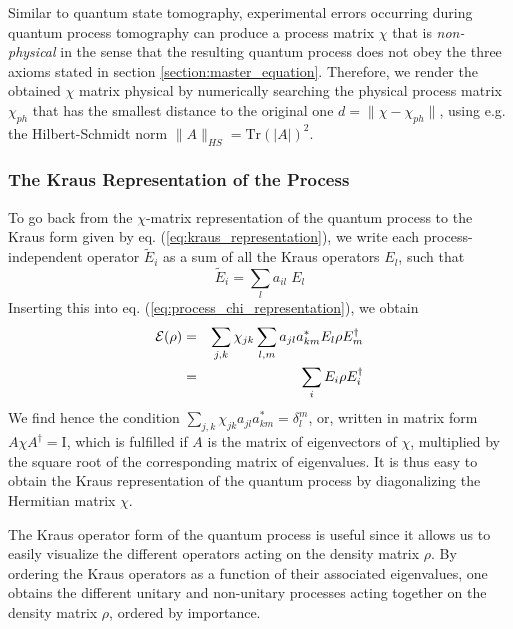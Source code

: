 \smallskip

Similar to quantum state tomography, experimental errors occurring during quantum process tomography can produce a process matrix $\chi$ that is {\it non-physical} in the sense that the resulting quantum process does not obey the three axioms stated in section \ref{section:master_equation}. Therefore, we render the obtained $\chi$ matrix physical by numerically searching the  physical process matrix $\chi_{ph}$ that has the smallest distance to the original one $d=\|\chi-\chi_{ph}\|$, using e.g. the Hilbert-Schmidt norm $\|A\|_{HS} = \mathrm{Tr}(|A|)^2$. 

\subsubsection{The Kraus Representation of the Process}

To go back from the $\chi$-matrix representation of the quantum process to the Kraus form given by eq. (\ref{eq:kraus_representation}), we write each process-independent operator $\tilde{E}_i$ as a sum of all the Kraus operators $E_l$, such that
%
\begin{equation}
	\tilde{E}_i = \sum\limits_l a_{il}\; E_l
\end{equation}
%
Inserting this into eq. (\ref{eq:process_chi_representation}), we obtain
%
\begin{eqnarray}
\begin{mathcal}E\end{mathcal}(\rho) & = & \sum\limits_{j,k}\chi_{jk}\sum\limits_{l,m} a_{jl}a_{km}^* E_l \rho E_m^\dagger   \label{eq:process_chi_transformed} \\
& = & \sum\limits_i E_i \rho E^\dagger_i
\end{eqnarray}
%
We find hence the condition $\sum\limits_{j,k} \chi_{jk}a_{jl}a_{km}^* = \delta_l^m$, or, written in matrix form $A\chi A^\dagger = \mathrm{I}$, which is fulfilled if $A$ is the matrix of eigenvectors of $\chi$, multiplied by the square root of the corresponding matrix of eigenvalues. It is thus easy to obtain the Kraus representation of the quantum process by diagonalizing the Hermitian matrix $\chi$.

\smallskip

The Kraus operator form of the quantum process is useful since it allows us to easily visualize the different operators acting on the density matrix $\rho$. By ordering the Kraus operators as a function of their associated eigenvalues, one obtains the different unitary and non-unitary processes acting together on the density matrix $\rho$, ordered by importance.


